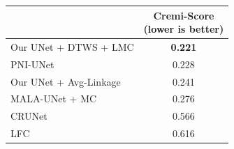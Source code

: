 \begin{figure}[t]
\begin{minipage}[t]{0.48\textwidth}
\begin{tabular}[t]{l|l|c}
        \end{tabular}
    \label{tab:results_cremi_train}
\end{minipage}\hfill
\begin{minipage}[t]{0.48\textwidth}
    \centering
    \scriptsize
        \begin{tabular}[t]{l|c}
         & \makecell{Cremi-Score \\(lower is better)}  \\ \midrule
Our UNet + DTWS + LMC &  \textbf{0.221}\\
PNI-UNet & 0.228 \\
Our UNet + \algname{} Avg-Linkage & 0.241 \\
MALA-UNet + MC \cite{funke2018large} & 0.276 \\
CRUNet \cite{zeng2017deepem3d} & 0.566  \\
LFC \cite{parag2017anisotropic} & 0.616  \\
        \end{tabular}
        \vspace*{1.1em}
    \label{tab:results_cremi_test}
\end{minipage}
\end{figure}
\captionsetup[subfigure]{justification=centering, singlelinecheck=off}
